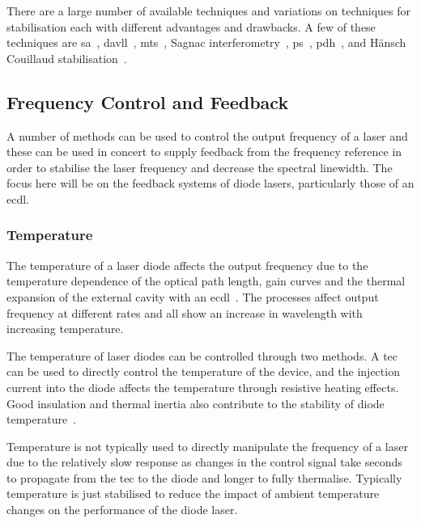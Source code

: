 There are a large number of available techniques and variations on techniques for stabilisation each with different advantages and drawbacks.
A few of these techniques are \gls{sa}~\cite{haroche_theory_1972, maguire_theoretical_2006, cuneo_optically_1994, preston_doppler-free_1996, saliba_linewidths_2009}, \gls{davll}~\cite{corwin_frequency-stabilized_1998, millett-sikking_davll_2007}, \gls{mts}~\cite{shirley_modulation_1982, mccarron_modulation_2008, xiang-hui_ultra-stable_2009,negnevitsky_wideband_2013}, Sagnac interferometry~\cite{robins_interferometric_2002, jundt_non-linear_2003}, \acrfull{ps}~\cite{wieman_doppler-free_1976, lancaster_polarisation_1999, yoshikawa_frequency_2003, harris_polarization_2006, pearman_polarization_2002, tiwari_laser_2006, do_polarization_2008, torii_laser-phase_2012}, \gls{pdh}~\cite{drever_laser_1983}, and H\"ansch Couillaud stabilisation~\cite{hansch_laser_1980}.

\subsection{Frequency Control and Feedback}

A number of methods can be used to control the output frequency of a laser and these can be used in concert to supply feedback from the frequency reference in order to stabilise the laser frequency and decrease the spectral linewidth.
The focus here will be on the feedback systems of diode lasers, particularly those of an \gls{ecdl}.

\subsubsection{Temperature}
The temperature of a laser diode affects the output frequency due to the temperature dependence of the optical path length, gain curves and the thermal expansion of the external cavity with an \gls{ecdl}~\cite{wieman_using_1991}.
The processes affect output frequency at different rates and all show an increase in wavelength with increasing temperature.

The temperature of laser diodes can be controlled through two methods. A \gls{tec} can be used to directly control the temperature of the device, and the injection current into the diode affects the temperature through resistive heating effects.
Good insulation and thermal inertia also contribute to the stability of diode temperature~\cite{saliba_cold_2011}.

Temperature is not typically used to directly manipulate the frequency of a laser due to the relatively slow response as changes in the control signal take seconds to propagate from the \gls{tec} to the diode and longer to fully thermalise.
Typically temperature is just stabilised to reduce the impact of ambient temperature changes on the performance of the diode laser.

